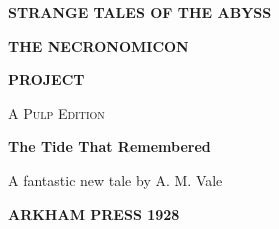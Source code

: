 \thispagestyle{empty}
\begin{center}
  \vspace*{8mm}
  {\color{Rust}\sffamily\bfseries\Large STRANGE TALES OF THE ABYSS\par}
  \vspace{4mm}
  {\Huge\bfseries THE NECRONOMICON\par}
  {\Huge\bfseries PROJECT\par}
  \vspace{3mm}
  {\Large\scshape A Pulp Edition\par}
  \vspace{8mm}
  \par
  \vspace{6mm}
  {\Large\bfseries The Tide That Remembered\par}
  \vfill
  {\large A fantastic new tale by A. M. Vale\par}
  \vspace{8mm}
  {\sffamily\bfseries ARKHAM PRESS \textbullet{} 1928\par}
\end{center}
\clearpage
